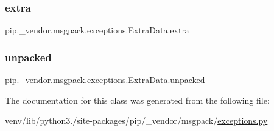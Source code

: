 \subsubsection{\texorpdfstring{extra}{extra}}
{\footnotesize\ttfamily pip.\+\_\+vendor.\+msgpack.\+exceptions.\+Extra\+Data.\+extra}

\mbox{\label{classpip_1_1__vendor_1_1msgpack_1_1exceptions_1_1ExtraData_a43525b229d0d573e376e955f1cffd662}} 
\subsubsection{\texorpdfstring{unpacked}{unpacked}}
{\footnotesize\ttfamily pip.\+\_\+vendor.\+msgpack.\+exceptions.\+Extra\+Data.\+unpacked}



The documentation for this class was generated from the following file\+:\begin{DoxyCompactItemize}
\item 
venv/lib/python3./site-\/packages/pip/\+\_\+vendor/msgpack/\hyperlink{pip_2__vendor_2msgpack_2exceptions_8py}{exceptions.\+py}\end{DoxyCompactItemize}
